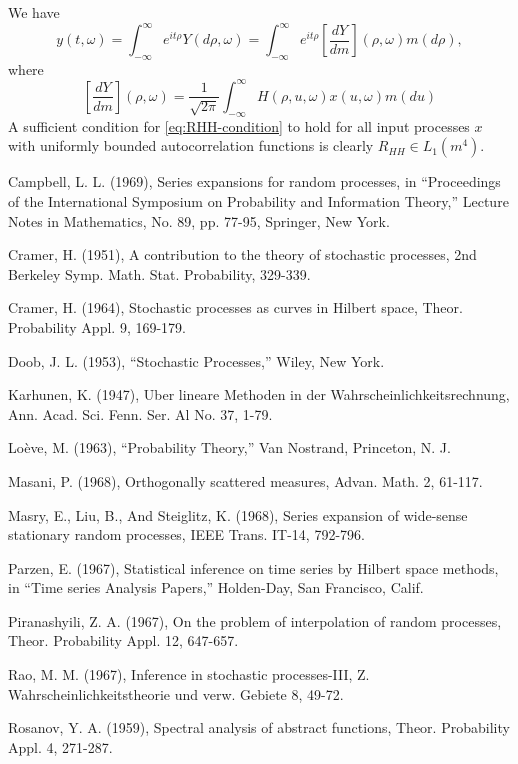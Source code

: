 \documentclass{article}
\begin{document}
We have
\begin{equation}
  y (t, \omega) = \int_{- \infty}^{\infty} e^{it \rho} Y (d \rho, \omega) =
  \int_{- \infty}^{\infty} e^{it \rho} \left[ \frac{dY}{dm} \right] (\rho,
  \omega) m (d \rho), \label{eq:y-harmonize-random}
\end{equation}
where
\begin{equation}
  \left[ \frac{dY}{dm} \right] (\rho, \omega) = \frac{1}{\sqrt{2 \pi}} 
  \int_{- \infty}^{\infty} H (\rho, u, \omega) x (u, \omega) m (du)
  \label{eq:dY-dm-H}
\end{equation}
A sufficient condition for \eqref{eq:RHH-condition} to hold for all input
processes $x$ with uniformly bounded autocorrelation functions is clearly
$R_{HH} \in L_1 (m^4)$.

\begin{thebibliography}{99}
  {}Campbell, L. L. (1969), Series expansions for random
  processes, in ``Proceedings of the International Symposium on Probability
  and Information Theory,'' Lecture Notes in Mathematics, No. 89, pp. 77-95,
  Springer, New York.
  
  {}Cramer, H. (1951), A contribution to the theory of
  stochastic processes, 2nd Berkeley Symp. Math. Stat. Probability, 329-339.
  
  {}Cramer, H. (1964), Stochastic processes as curves in
  Hilbert space, Theor. Probability Appl. 9, 169-179.
  
  {}Doob, J. L. (1953), ``Stochastic Processes,'' Wiley, New
  York.
  
  {}Karhunen, K. (1947), Uber lineare Methoden in der
  Wahrscheinlichkeitsrechnung, Ann. Acad. Sci. Fenn. Ser. Al No. 37, 1-79.
  
  {}Lo{\`e}ve, M. (1963), ``Probability Theory,'' Van
  Nostrand, Princeton, N. J.
  
  {}Masani, P. (1968), Orthogonally scattered measures,
  Advan. Math. 2, 61-117.
  
  {}Masry, E., Liu, B., And Steiglitz, K. (1968), Series
  expansion of wide-sense stationary random processes, IEEE Trans. IT-14,
  792-796.
  
  {}Parzen, E. (1967), Statistical inference on time
  series by Hilbert space methods, in ``Time series Analysis Papers,''
  Holden-Day, San Francisco, Calif.
  
  {}Piranashyili, Z. A. (1967), On the problem of
  interpolation of random processes, Theor. Probability Appl. 12, 647-657.
  
  {}Rao, M. M. (1967), Inference in stochastic processes-III,
  Z. Wahrscheinlichkeitstheorie und verw. Gebiete 8, 49-72.
  
  {}Rosanov, Y. A. (1959), Spectral analysis of abstract
  functions, Theor. Probability Appl. 4, 271-287.
\end{thebibliography}
\end{document}
